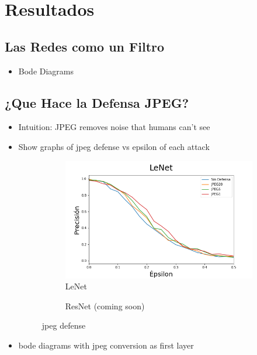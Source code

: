 \section{Resultados}
\subsection{Las Redes como un Filtro}
\begin{itemize}
    \item Bode Diagrams
\end{itemize}
\subsection{¿Que Hace la Defensa JPEG?}
\begin{itemize}
    \item Intuition: JPEG removes noise that humans can't see
    \item Show graphs of jpeg defense vs epsilon of each attack
    \begin{figure}[h]
        \centering
        \begin{subfigure}[b]{0.49\textwidth}
            \centering
            \includegraphics[width=\textwidth]{images/jpegdefense_vs_epsilon.png}
            \caption{LeNet}
            \label{jpeg_def}
        \end{subfigure}
        \begin{subfigure}[b]{0.49\textwidth}
            \centering
            \caption{ResNet (coming soon)}
            \label{jpeg_def}
        \end{subfigure}
        \caption{jpeg defense}
    \end{figure}
    \item bode diagrams with jpeg conversion as first layer
\end{itemize}
